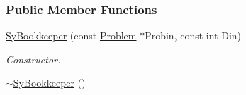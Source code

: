 \subsubsection*{Public Member Functions}
\begin{DoxyCompactItemize}
\item 
\hyperlink{classCheMPS2_1_1SyBookkeeper_a755ef2a2c237dcacba3ac4a5a8ea272a}{Sy\-Bookkeeper} (const \hyperlink{classCheMPS2_1_1Problem}{Problem} $\ast$Probin, const int Din)
\begin{DoxyCompactList}\small\item\em Constructor. \end{DoxyCompactList}\item 
\hypertarget{classCheMPS2_1_1SyBookkeeper_a3904b642db40bc33db72612d3c534f8f}{\hyperlink{classCheMPS2_1_1SyBookkeeper_a3904b642db40bc33db72612d3c534f8f}{$\sim$\-Sy\-Bookkeeper} ()}\label{classCheMPS2_1_1SyBookkeeper_a3904b642db40bc33db72612d3c534f8f}


\end{DoxyCompactItemize}
